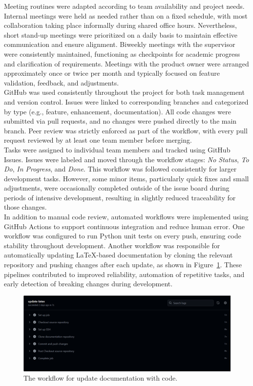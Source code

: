 Meeting routines were adapted according to team availability and project needs. Internal meetings were held as needed rather than on a fixed schedule, with most collaboration taking place informally during shared office hours. Nevertheless, short stand-up meetings were prioritized on a daily basis to maintain effective communication and ensure alignment. Biweekly meetings with the supervisor were consistently maintained, functioning as checkpoints for academic progress and clarification of requirements. Meetings with the product owner were arranged approximately once or twice per month and typically focused on feature validation, feedback, and adjustments. \\

GitHub was used consistently throughout the project for both task management and version control. Issues were linked to corresponding branches and categorized by type (e.g., feature, enhancement, documentation). All code changes were submitted via pull requests, and no changes were pushed directly to the main branch. Peer review was strictly enforced as part of the workflow, with every pull request reviewed by at least one team member before merging. \\

Tasks were assigned to individual team members and tracked using GitHub Issues. Issues were labeled and moved through the workflow stages: \textit{No Status}, \textit{To Do}, \textit{In Progress}, and \textit{Done}. This workflow was followed consistently for larger development tasks. However, some minor items, particularly quick fixes and small adjustments, were occasionally completed outside of the issue board during periods of intensive development, resulting in slightly reduced traceability for those changes.\\

In addition to manual code review, automated workflows were implemented using GitHub Actions to support continuous integration and reduce human error. One workflow was configured to run Python unit tests on every push, ensuring code stability throughout development. Another workflow was responsible for automatically updating LaTeX-based documentation by cloning the relevant repository and pushing changes after each update, as shown in Figure~\ref{fig:workflow-latex}. These pipelines contributed to improved reliability, automation of repetitive tasks, and early detection of breaking changes during development. \\

\begin{figure}[h!] \centering 
\includegraphics[width=0.75\linewidth]{figures/results/workflows/latex.png}\caption[Upload LaTeX workflow]{The workflow for update documentation with code.}\label{fig:workflow-latex} \end{figure}

